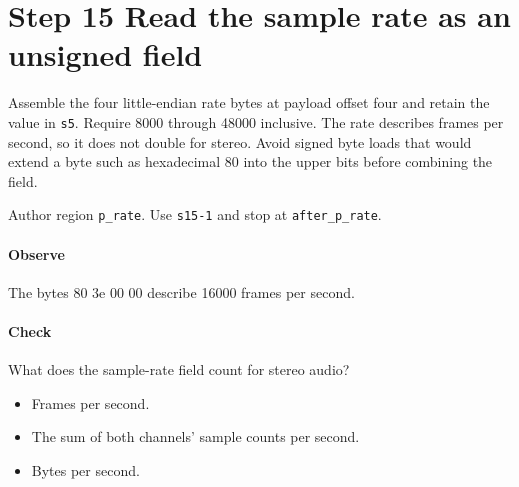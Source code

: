 \section{Step 15 Read the sample rate as an unsigned field}\label{pcm-wav-s15}
Assemble the four little-endian rate bytes at payload offset four and retain the value in \texttt{s5}. Require 8000 through 48000 inclusive. The rate describes frames per second, so it does not double for stereo. Avoid signed byte loads that would extend a byte such as hexadecimal 80 into the upper bits before combining the field.

Author region \texttt{p\_rate}. Use \texttt{s15-1} and stop at \texttt{after\_p\_rate}.

\paragraph{Observe} The bytes 80 3e 00 00 describe 16000 frames per second.

\paragraph{Check} What does the sample-rate field count for stereo audio?
\begin{itemize}
  \item[A.] Frames per second.
  \item[B.] The sum of both channels' sample counts per second.
  \item[C.] Bytes per second.
\end{itemize}

